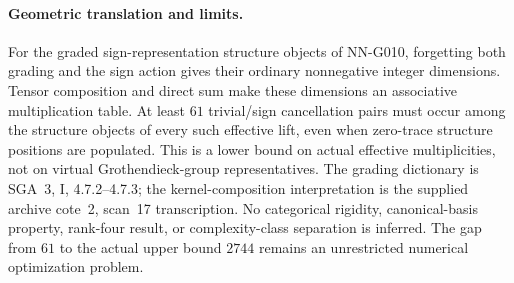 \paragraph{Geometric translation and limits.}
For the graded sign-representation structure objects of
NN-G010, forgetting both grading and the sign action
gives their ordinary nonnegative integer dimensions.
Tensor composition and direct sum make these dimensions
an associative multiplication table.
At least $61$ trivial/sign cancellation pairs must occur
among the structure objects of every such effective lift,
even when zero-trace structure positions are populated.
This is a lower bound on actual effective multiplicities,
not on virtual Grothendieck-group representatives.
The grading dictionary is SGA~3, I, 4.7.2--4.7.3;
the kernel-composition interpretation is the supplied
archive cote~2, scan~17 transcription.
No categorical rigidity, canonical-basis property, rank-four
result, or complexity-class separation is inferred.
The gap from $61$ to the actual upper bound $2744$
remains an unrestricted numerical optimization problem.
